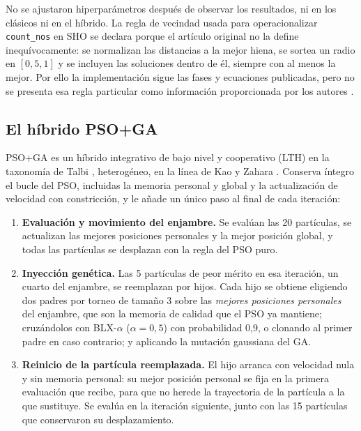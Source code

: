 \TablaHiperparametrosAuto

No se ajustaron hiperparámetros después de observar los resultados, ni en los clásicos ni en el híbrido. La regla de vecindad usada para operacionalizar \texttt{count\_nos} en SHO se declara porque el artículo original no la define inequívocamente: se normalizan las distancias a la mejor hiena, se sortea un radio en $[0{,}5,1]$ y se incluyen las soluciones dentro de él, siempre con al menos la mejor. Por ello la implementación sigue las fases y ecuaciones publicadas, pero no se presenta esa regla particular como información proporcionada por los autores \cite{Dhiman2017SHO}.

\subsection{El híbrido PSO+GA}
\label{sec:hibrido}

PSO+GA es un híbrido integrativo de bajo nivel y cooperativo (LTH) en la taxonomía de Talbi \cite{Talbi2002Taxonomy}, heterogéneo, en la línea de Kao y Zahara \cite{Kao2008HybridGAPSO}. Conserva íntegro el bucle del PSO, incluidas la memoria personal y global y la actualización de velocidad con constricción, y le añade un único paso al final de cada iteración:

\begin{enumerate}
    \item \textbf{Evaluación y movimiento del enjambre.} Se evalúan las 20 partículas, se actualizan las mejores posiciones personales y la mejor posición global, y todas las partículas se desplazan con la regla del PSO puro.
    \item \textbf{Inyección genética.} Las 5 partículas de peor mérito en esa iteración, un cuarto del enjambre, se reemplazan por hijos. Cada hijo se obtiene eligiendo dos padres por torneo de tamaño 3 sobre las \emph{mejores posiciones personales} del enjambre, que son la memoria de calidad que el PSO ya mantiene; cruzándolos con BLX-$\alpha$ ($\alpha=0{,}5$) con probabilidad 0,9, o clonando al primer padre en caso contrario; y aplicando la mutación gaussiana del GA.
    \item \textbf{Reinicio de la partícula reemplazada.} El hijo arranca con velocidad nula y sin memoria personal: su mejor posición personal se fija en la primera evaluación que recibe, para que no herede la trayectoria de la partícula a la que sustituye. Se evalúa en la iteración siguiente, junto con las 15 partículas que conservaron su desplazamiento.
\end{enumerate}

